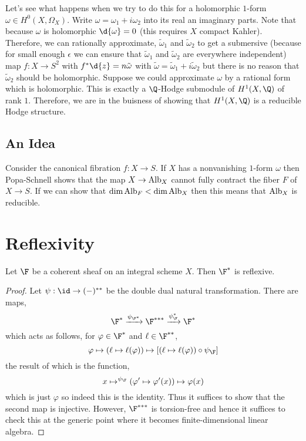 \documentclass[12pt]{article}
\begin{document}
\begin{rmk}
Let's see what happens when we try to do this for a holomorphic $1$-form $\omega \in H^0(X, \Omega_X)$. Write $\omega = \omega_1 + i \omega_2$ into its real an imaginary parts. Note that because $\omega$ is holomorphic $\d{\omega} = 0$ (this requires $X$ compact Kahler). Therefore, we can rationally approximate, $\tilde{\omega}_1$ and $\tilde{\omega}_2$ to get a submersive (because for small enough $\epsilon$ we can ensure that $\tilde{\omega}_1$ and $\tilde{\omega}_2$ are everywhere independent) map $f : X \to S^2$ with $f^* \d{z} = n \tilde{\omega}$ with $\tilde{\omega} = \tilde{\omega}_1 + i \tilde{\omega}_2$ but there is no reason that $\tilde{\omega}_2$ should be holomorphic. Suppose we could approximate $\omega$ by a rational form which is holomorphic. This is exactly a $\Q$-Hodge submodule of $H^1(X, \Q)$ of rank $1$. Therefore, we are in the buisness of showing that $H^1(X, \Q)$ is a reducible Hodge structure.  
\end{rmk}


\subsection{An Idea}

Consider the canonical fibration $f : X \to S$. If $X$ has a nonvanishing $1$-form $\omega$ then Popa-Schnell shows that the map $X \to \mathrm{Alb}_X$ cannot fully contract the fiber $F$ of $X \to S$. If we can show that $\dim{\mathrm{Alb}_F} < \dim{\mathrm{Alb}_X}$ then this means that $\mathrm{Alb}_X$ is reducible. 

\section{Reflexivity}

\begin{prop}
Let $\F$ be a coherent sheaf on an integral scheme $X$. Then $\F^*$ is reflexive. 
\end{prop}

\begin{proof}
Let $\psi : \id \to (-)^{* *}$ be the double dual natural transformation.
There are maps,
\[ \F^* \xrightarrow{\psi_{\F^*}} \F^{***} \xrightarrow{\psi_{\F}^*} \F^* \]
which acts as follows, for $\varphi \in \F^*$ and $\ell \in \F^{**}$,
\[ \varphi \mapsto (\ell \mapsto \ell(\varphi)) \mapsto [(\ell \mapsto \ell(\varphi)) \circ \psi_{\F}]   \]
the result of which is the function,
\[ x \mapsto^{\psi_{\F}} (\varphi' \mapsto \varphi'(x)) \mapsto \varphi(x) \]
which is just $\varphi$ so indeed this is the identity. Thus it suffices to show that the second map is injective. However, $\F^{***}$ is torsion-free and hence it suffices to check this at the generic point where it becomes finite-dimensional linear algebra. 
\end{proof}
\end{document}
